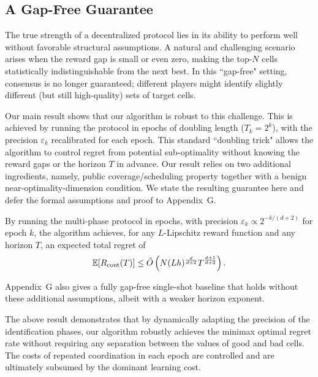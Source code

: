 \subsection{A Gap-Free Guarantee}

The true strength of a decentralized protocol lies in its ability to perform well without favorable structural assumptions. A natural and challenging scenario arises when the reward gap is small or even zero, making the top-$N$ cells statistically indistinguishable from the next best. In this ``gap-free" setting, consensus is no longer guaranteed; different players might identify slightly different (but still high-quality) sets of target cells.

Our main result shows that our algorithm is robust to this challenge. This is achieved by running the protocol in epochs of doubling length ($T_k=2^k$), with the precision $\varepsilon_k$ recalibrated for each epoch. This standard ``doubling trick" \citep{cesa-bianchi2006prediction} allows the algorithm to control regret from potential sub-optimality without knowing the reward gaps or the horizon $T$ in advance. Our result relies on two additional ingredients, namely, public coverage/scheduling property together with a benign near-optimality-dimension condition. We state the resulting guarantee here and defer the formal assumptions and proof to Appendix~G. 

\begin{corollary}\label{cor:epochic-gapfree}
By running the multi-phase protocol in epochs, with precision $\varepsilon_k \propto 2^{-k/(d+2)}$ for epoch $k$, the algorithm achieves, for any $L$-Lipschitz reward function and any horizon $T$, an expected total regret of
\[
\mathbb{E}[R_{\mathrm{cont}}(T)] \le \tilde{O}\left(N(Lh)^{\frac{d}{d+2}} T^{\frac{d+1}{d+2}}\right).
\]
\end{corollary}

Appendix~G also gives a fully gap-free single-shot baseline that holds without these additional assumptions, albeit with a weaker horizon exponent.

The above result demonstrates that by dynamically adapting the precision of the identification phases, our algorithm robustly achieves the minimax optimal regret rate without requiring any separation between the values of good and bad cells. The costs of repeated coordination in each epoch are controlled and are ultimately subsumed by the dominant learning cost.
